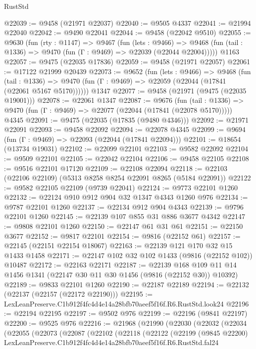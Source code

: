 \begin{lexlean}{RustStd}
\begin{coremodule}
@22039 := @9458 (@21971 @22037)
@22040 := @9505 @4337
@22041 := @21994 @22040
@22042 := @9490 @22041
@22044 := @9458 (@22042 @9510)
@22055 := @9630
    (fun (rty : @1147) =>
    @9467
      (fun (lets : @9466) =>
      @9468 (fun (tail : @1336) => @9470 (fun (Γ : @9469) => @22039 (@22044 @22004)))))
    @1163
@22057 := @9475 (@22035 @17836)
@22059 := @9458 (@21971 @22057)
@22061 := @17122 @21999 @20439
@22073 := @9652
    (fun (lets : @9466) =>
    @9468
      (fun (tail : @1336) =>
      @9470 (fun (Γ : @9469) => @22059 (@22044 (@17841 (@22061 @5167 @5170))))))
    @1347
@22077 := @9458 (@21971 (@9475 (@22035 @19001)))
@22078 := @22061 @1347
@22087 := @9676
    (fun (tail : @1336) => @9470 (fun (Γ : @9469) => @22077 (@22044 (@17841 (@22078 @5170)))))
    @4345
@22091 := @9475 (@22035 (@17835 (@9480 @4346)))
@22092 := @21971 @22091
@22093 := @9458 @22092
@22094 := @22078 @4345
@22099 := @9694 (fun (Γ : @9469) => @22093 (@22044 (@17841 @22094)))
@22101 := @18654 (@13734 @19031)
@22102 := @22099 @22101
@22103 := @9582 @22092
@22104 := @9509 @22101
@22105 := @22042 @22104
@22106 := @9458 @22105
@22108 := @9516 @22101 @17120
@22109 := @22108 @22094
@22118 := @22103 (@22106 @22109) (@5313 @8258 @8254 @22091 @8265 (@5184 @22091))
@22122 := @9582 @22105 @22109 (@9739 @22041)
@22124 := @9773 @22101 @1260
@22132 := @22124 @910 @912 @904 @32 @1347 @4343 @1260 @976
@22134 := @9787 @22101 @1260
@22137 := @22134 @912 @904 @4343
@22139 := @9796 @22101 @1260
@22145 := @22139 @107 @855 @31 @886 @3677 @4342
@22147 := @9808 @22101 @1260
@22150 := @22147 @61 @31 @61
@22151 := @22150 @3677
@22152 := @9817 @22101
@22154 := @9816 (@22152 @61)
@22157 := @22145 (@22151 @22154 @18067)
@22163 := @22139 @121 @170 @32 @15 @1433 @1458
@22171 := @22147 @102 @32 @102 @1433 (@9816 (@22152 @102)) @10487
@22172 := @22163 @22171
@22187 := @22139
    @168
    @109
    @11
    @14
    @1456
    @1341
    (@22147 @30 @11 @30 @1456 (@9816 (@22152 @30)) @10392)
@22189 := @9833 @22101 @1260
@22190 := @22187 @22189
@22194 := @22132 (@22137 (@22157 (@22172 @22190)))
@22195 := LexLeanPreserve.C1b912f4fc4d4e14a28bfb70aeef5f16f.R6.RustStd.look24
@22196 := @22194 @22195
@22197 := @9502 @976
@22199 := @22196 (@9841 @22197)
@22200 := @9525 @976
@22216 := @21968
    (@21990
      (@22030
        (@22032
          (@22034
            (@22055
              (@22073
                (@22087
                  (@22102
                    (@22118
                      (@22122
                        (@22199
                          (@9845 @22200)
                          LexLeanPreserve.C1b912f4fc4d4e14a28bfb70aeef5f16f.R6.RustStd.fal24

\end{coremodule}
\end{lexlean}
